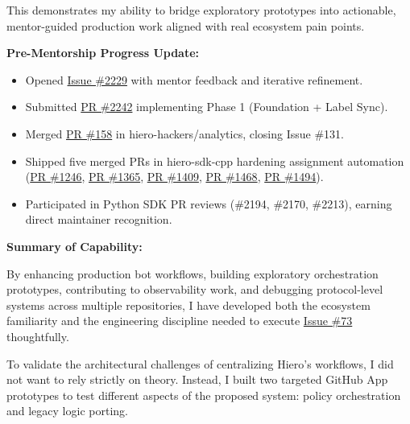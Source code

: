 \documentclass[11pt]{article}
\newcommand{\mainheading}[1]{\par\vspace{10pt}\noindent{\fontsize{15pt}{18pt}\selectfont\textcolor{headingblue}{#1}}
\par\vspace{4pt}}
\newcommand{\issueseventythree}{\href{https://github.com/LF-Decentralized-Trust-Mentorships/mentorship-program/issues/73}{Issue \#73}\xspace}
\begin{document}
This demonstrates my ability to bridge exploratory prototypes into actionable, mentor-guided production work aligned with real ecosystem pain points.

\textbf{Pre-Mentorship Progress Update:}
\begin{itemize}[leftmargin=18pt,itemsep=2pt,topsep=2pt]
    \item Opened \href{https://github.com/hiero-ledger/hiero-sdk-python/issues/2229}{Issue \#2229} with mentor feedback and iterative refinement.
    \item Submitted \href{https://github.com/hiero-ledger/hiero-sdk-python/pull/2242}{PR \#2242} implementing Phase 1 (Foundation + Label Sync).
    \item Merged \href{https://github.com/hiero-hackers/analytics/pull/158}{PR \#158} in hiero-hackers/analytics, closing Issue \#131.
    \item Shipped five merged PRs in hiero-sdk-cpp hardening assignment automation (\href{https://github.com/hiero-ledger/hiero-sdk-cpp/pull/1246}{PR \#1246}, \href{https://github.com/hiero-ledger/hiero-sdk-cpp/pull/1365}{PR \#1365}, \href{https://github.com/hiero-ledger/hiero-sdk-cpp/pull/1409}{PR \#1409}, \href{https://github.com/hiero-ledger/hiero-sdk-cpp/pull/1468}{PR \#1468}, \href{https://github.com/hiero-ledger/hiero-sdk-cpp/pull/1494}{PR \#1494}).
    \item Participated in Python SDK PR reviews (\#2194, \#2170, \#2213), earning direct maintainer recognition.
\end{itemize}

\textbf{Summary of Capability:}

By enhancing production bot workflows, building exploratory orchestration prototypes, contributing to observability work, and debugging protocol-level systems across multiple repositories, I have developed both the ecosystem familiarity and the engineering discipline needed to execute \issueseventythree thoughtfully.
\mainheading{3. Exploratory Prototypes (The Research Phase)}

\vspace{5pt}
To validate the architectural challenges of centralizing Hiero's workflows, I did not want to rely strictly on theory. Instead, I built two targeted GitHub App prototypes to test different aspects of the proposed system: policy orchestration and legacy logic porting.
\end{document}
